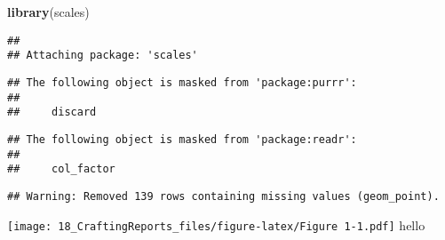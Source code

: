 \documentclass[]{article}
\newenvironment{Shaded}{\begin{snugshade}}{\end{snugshade}}
\newcommand{\DataTypeTok}[1]{\textcolor[rgb]{0.13,0.29,0.53}{#1}}
\newcommand{\KeywordTok}[1]{\textcolor[rgb]{0.13,0.29,0.53}{\textbf{#1}}}
\newcommand{\NormalTok}[1]{#1}
\newcommand{\OperatorTok}[1]{\textcolor[rgb]{0.81,0.36,0.00}{\textbf{#1}}}
\newcommand{\StringTok}[1]{\textcolor[rgb]{0.31,0.60,0.02}{#1}}
\begin{document}
\begin{Shaded}
\begin{Highlighting}[]
\KeywordTok{library}\NormalTok{(scales)}
\end{Highlighting}
\end{Shaded}

\begin{verbatim}
## 
## Attaching package: 'scales'
\end{verbatim}

\begin{verbatim}
## The following object is masked from 'package:purrr':
## 
##     discard
\end{verbatim}

\begin{verbatim}
## The following object is masked from 'package:readr':
## 
##     col_factor
\end{verbatim}

\begin{Shaded}
\end{Shaded}

\begin{verbatim}
## Warning: Removed 139 rows containing missing values (geom_point).
\end{verbatim}

\texttt{[image: 18\_CraftingReports\_files/figure-latex/Figure 1-1.pdf]}
hello
\end{document}
